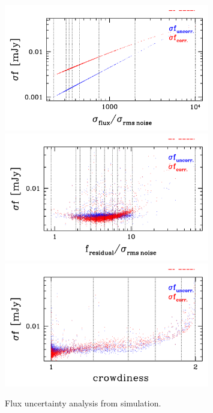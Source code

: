 \documentclass[11pt,a4paper]{article}
\begin{document}
\begin{figure}[H]
	\includegraphics[width=0.8\textwidth]{galsim_20cm_Glenn_dfcorr_1}
	\includegraphics[width=0.8\textwidth]{galsim_20cm_Glenn_dfcorr_2}
	\includegraphics[width=0.8\textwidth]{galsim_20cm_Glenn_dfcorr_3}
	\caption{Flux uncertainty analysis from simulation.}
\end{figure}
\end{document}
